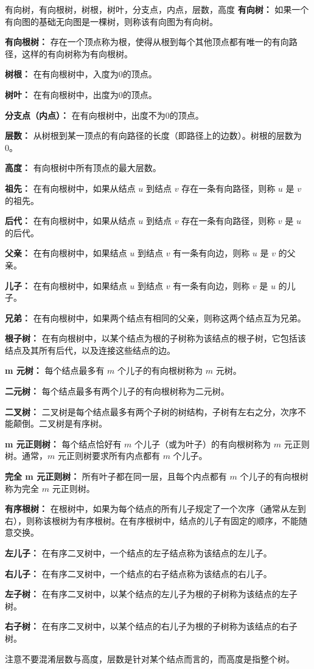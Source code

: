 \begin{definition}{有向树，有向根树，树根，树叶，分支点，内点，层数，高度}{}
\textbf{有向树：} 如果一个有向图的基础无向图是一棵树，则称该有向图为有向树。

\textbf{有向根树：} 存在一个顶点称为根，使得从根到每个其他顶点都有唯一的有向路径，这样的有向树称为有向根树。

\textbf{树根：} 在有向根树中，入度为0的顶点。

\textbf{树叶：} 在有向根树中，出度为0的顶点。

\textbf{分支点（内点）：} 在有向根树中，出度不为0的顶点。

\textbf{层数：} 从树根到某一顶点的有向路径的长度（即路径上的边数）。树根的层数为0。

\textbf{高度：} 有向根树中所有顶点的最大层数。

\textbf{祖先：} 在有向根树中，如果从结点 $u$ 到结点 $v$ 存在一条有向路径，则称 $u$ 是 $v$ 的祖先。

\textbf{后代：} 在有向根树中，如果从结点 $u$ 到结点 $v$ 存在一条有向路径，则称 $v$ 是 $u$ 的后代。

\textbf{父亲：} 在有向根树中，如果结点 $u$ 到结点 $v$ 有一条有向边，则称 $u$ 是 $v$ 的父亲。

\textbf{儿子：} 在有向根树中，如果结点 $u$ 到结点 $v$ 有一条有向边，则称 $v$ 是 $u$ 的儿子。

\textbf{兄弟：} 在有向根树中，如果两个结点有相同的父亲，则称这两个结点互为兄弟。

\textbf{根子树：} 在有向根树中，以某个结点为根的子树称为该结点的根子树，它包括该结点及其所有后代，以及连接这些结点的边。

\textbf{m 元树：} 每个结点最多有 $m$ 个儿子的有向根树称为 $m$ 元树。

\textbf{二元树：} 每个结点最多有两个儿子的有向根树称为二元树。

\textbf{二叉树：} 二叉树是每个结点最多有两个子树的树结构，子树有左右之分，次序不能颠倒。二叉树是有序树。

\textbf{m 元正则树：} 每个结点恰好有 $m$ 个儿子（或为叶子）的有向根树称为 $m$ 元正则树。通常，$m$ 元正则树要求所有内点都有 $m$ 个儿子。

\textbf{完全 m 元正则树：} 所有叶子都在同一层，且每个内点都有 $m$ 个儿子的有向根树称为完全 $m$ 元正则树。

\textbf{有序根树：} 在根树中，如果为每个结点的所有儿子规定了一个次序（通常从左到右），则称该根树为有序根树。在有序根树中，结点的儿子有固定的顺序，不能随意交换。

\textbf{左儿子：} 在有序二叉树中，一个结点的左子结点称为该结点的左儿子。

\textbf{右儿子：} 在有序二叉树中，一个结点的右子结点称为该结点的右儿子。

\textbf{左子树：} 在有序二叉树中，以某个结点的左儿子为根的子树称为该结点的左子树。

\textbf{右子树：} 在有序二叉树中，以某个结点的右儿子为根的子树称为该结点的右子树。
\end{definition}
注意不要混淆层数与高度，层数是针对某个结点而言的，而高度是指整个树。

